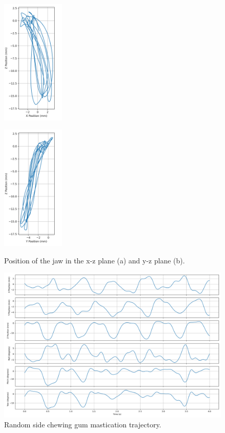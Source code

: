 \begin{figure}[H]
\centering
\begin{minipage}{.45\textwidth}
  \centering
  \includegraphics[height=6cm]{figures/x_vs_z_position.png}
  \subcaption{}
  \label{fig:x-z}
\end{minipage}
\begin{minipage}{.45\textwidth}
  \centering
  \includegraphics[height=6cm]{figures/y_vs_z_position.png}
  \subcaption{}
  \label{fig:y-z}
\end{minipage}
\caption{Position of the jaw in the x-z plane (a) and y-z plane (b).}
\label{fig:xy-z}
\end{figure}

\begin{figure}[H]
    \centering
    \includegraphics[width=\textwidth]{figures/trajectory_plot.png}
    \caption{Random side chewing gum mastication trajectory.}
    \label{fig:trajectory_plot}
\end{figure}

